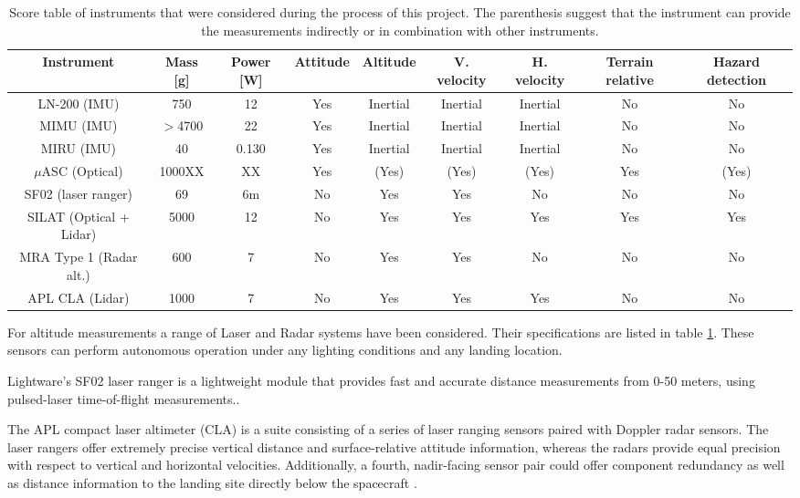 {\begin{table}
\begin{flushleft}

\begin{tabular}{|c|c|c|c|c|c|c|c|c|}
\hline 
Instrument & Mass [g] & Power [W] &Attitude & Altitude & V. velocity & H. velocity & Terrain relative & Hazard detection\\ 
\hline
LN-200 (IMU) & 750 & 12 & Yes & Inertial & Inertial & Inertial & No & No\\
\hline
MIMU (IMU) & $>$4700 & 22 & Yes& Inertial & Inertial & Inertial & No & No\\
\hline

MIRU (IMU)& 40 & 0.130 & Yes& Inertial & Inertial & Inertial & No & No\\
\hline
$\mu$ASC (Optical)  & 1000XX & XX& Yes & (Yes) & (Yes) & (Yes) & Yes & (Yes)\\
\hline
SF02 (laser ranger) & 69  & 6m & No & Yes  & Yes & No & No & No\\
\hline
SILAT (Optical + Lidar) & 5000  & 12 & No & Yes & Yes & Yes & Yes & Yes \\
\hline
MRA Type 1 (Radar alt.) & 600 & 7& No & Yes  & Yes & No & No & No \\
\hline
APL CLA (Lidar) & 1000 & 7 & No & Yes & Yes & Yes & No& No \\
\hline

 

\end{tabular}
\caption{Score table of instruments that were considered during the process of this project. The parenthesis suggest that the instrument can provide the measurements indirectly or in combination with other instruments. }
\label{tab:sensors}
\end{flushleft}
\end{table}


For altitude measurements a range of Laser and Radar systems have been considered. Their specifications are listed in table \ref{tab:sensors}. These sensors can perform autonomous operation under any lighting conditions and any landing location.

Lightware’s SF02 laser ranger is a lightweight module that provides fast and accurate distance measurements from 0-50 meters, using pulsed-laser time-of-flight measurements.\cite{https://www.parallax.com/product/28043}. 

The APL compact laser altimeter (CLA) is a suite consisting of a series of laser ranging sensors paired with  Doppler radar sensors. The laser rangers offer extremely precise vertical distance and surface-relative attitude information, whereas the radars provide equal precision with respect to vertical and horizontal velocities. Additionally, a fourth, nadir-facing sensor pair could offer component redundancy as well as distance information to the landing site directly below the spacecraft \cite{http://www.jhuapl.edu/techdigest/TD/td3004/30_4-Bruzzi.pdf}. 


}

